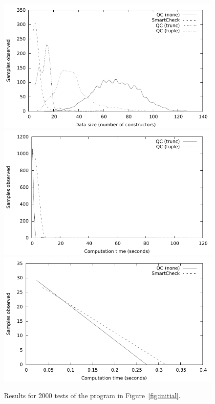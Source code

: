 \documentclass{sigplanconf}
\begin{document}
\begin{figure}[ht]
\includegraphics[scale=0.6]{Graphs/data}
\includegraphics[scale=0.6]{Graphs/time-big}
\includegraphics[scale=0.6]{Graphs/time-small}
  \caption{Results for 2000 tests of the program in Figure~\ref{fig:initial}.}
  \label{fig:graphs}
\end{figure}
\end{document}
